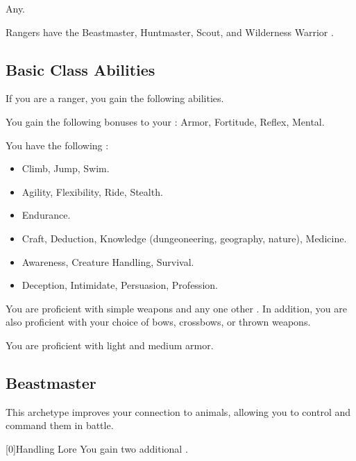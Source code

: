      Any.

     Rangers have the Beastmaster, Huntmaster, Scout, and Wilderness Warrior .

    \subsection{Basic Class Abilities}
        If you are a ranger, you gain the following abilities.

        You gain the following bonuses to your :  Armor,  Fortitude,  Reflex,  Mental.

        You have the following :
        \begin{itemize}
            \item {} Climb, Jump, Swim.
            \item {} Agility, Flexibility, Ride, Stealth.
            \item {} Endurance.
            \item {} Craft, Deduction, Knowledge (dungeoneering, geography, nature), Medicine.
            \item {} Awareness, Creature Handling, Survival.
            \item {} Deception, Intimidate, Persuasion, Profession.
        \end{itemize}

        You are proficient with simple weapons and any one other .
        In addition, you are also proficient with your choice of bows, crossbows, or thrown weapons.

        You are proficient with light and medium armor.

    \newpage
    \subsection{Beastmaster}
        This archetype improves your connection to animals, allowing you to control and command them in battle.

        [0]{Handling Lore} You gain two additional .

